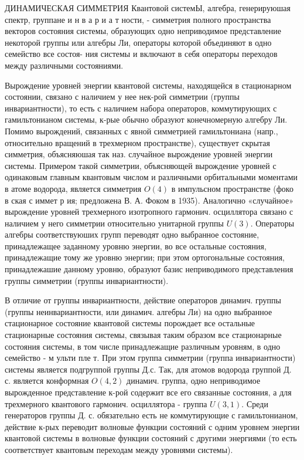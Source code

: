 \documentclass[10pt]{article}
\begin{document}
ДИНАМИЧЕСКАЯ СИММЕТРИЯ Квантовой системЫ, алгебра, генерируюшая спектр, группане и н в а р и а т ности, - симметрия полного пространства векторов состояния системы, образующих одно неприводимое представление некоторой группы или алгебры Ли, операторы которой объединяют в одно семейство все состоя- ния системы и включают в себя операторы переходов между различными состояниями.



Вырождение уровней энергии квантовой системы, находящейся в стационарном состоянии, связано с наличием у нее нек-рой симметрии (группы инвариантности), то есть с наличием набора операторов, коммутирующих с гамильтонианом системы, к-рые обычно образуют конечномерную алгебру Ли. Помимо вырождений, связанных с явной симметрией гамильтониана (напр., относительно вращений в трехмерном пространстве), существует скрытая симметрия, объясняюшая так наз. случайное вырождение уровней энергии системы. Примером такой симметрии, объясняющей вырождение уровней с одинаковым главным квантовым числом и различными орбитальными моментами в атоме водорода, является симметрия $O(4)$ в импульсном пространстве (фоко в ская с иммет р ия; предложена В. А. Фоком в 1935). Аналогично «случайное» вырождение уровней трехмерного изотропного гармонич. осциллятора связано с наличием у него симметрии относительно унитарной группы $U(3)$. Операторы алгебры соответствуюших групп переводят одно выбранное состояние, принадлежащее заданному уровню энергии, во все остальные состояния, принадлежащие тому же уровню энергии; при этом ортогональные состояния, принадлежашие данному уровню, образуют базис неприводимого представления группы симметрии (группы инвариантности).



В отличие от группы инвариантности, действие операторов динамич. группы (группы неинвариантности, или динамич. алгебры Ли) на одно выбранное стационарное состояние квантовой системы порождает все остальные стационарные состояния системы, связывая таким образом все стационарные состояния системы, в том числе принадлежащие различным уровням, в одно семейство - м ульти пле т. При этом группа симметрии (группа инвариантности) системы является подгруппой группы Д.с. Так, для атомов водорода группой Д. с. является конформная $O(4,2)$ динамич. группа, одно неприводимое вырожденное представление к-рой содержит все его связанные состояния, а для трехмерного квантового гармонич. осциллятора - группа $U(3,1)$. Среди генераторов группы Д. с. обязательно есть не коммутирующие с гамильтонианом, действие к-рых переводит волновые функции состояний с одним уровнем энергии квантовой системы в волновые функции состояний с другими энергиями (то есть соответствует квантовым переходам между уровнями системы).
\end{document}
